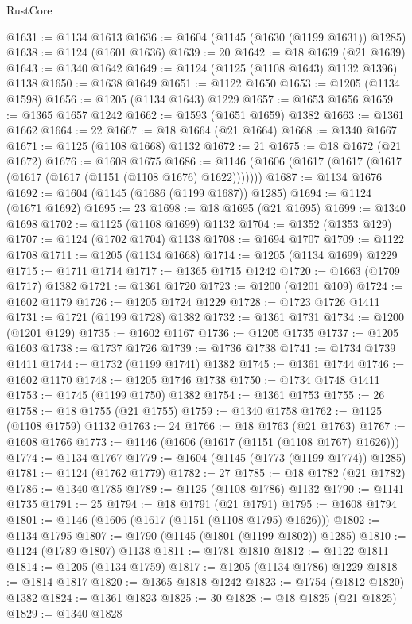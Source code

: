 \begin{lexlean}{RustCore}
\begin{coremodule}
@1631 := @1134 @1613
@1636 := @1604 (@1145 (@1630 (@1199 @1631)) @1285)
@1638 := @1124 (@1601 @1636)
@1639 := 20
@1642 := @18 @1639 (@21 @1639)
@1643 := @1340 @1642
@1649 := @1124 (@1125 (@1108 @1643) @1132 @1396) @1138
@1650 := @1638 @1649
@1651 := @1122 @1650
@1653 := @1205 (@1134 @1598)
@1656 := @1205 (@1134 @1643) @1229
@1657 := @1653 @1656
@1659 := @1365 @1657 @1242
@1662 := @1593 (@1651 @1659) @1382
@1663 := @1361 @1662
@1664 := 22
@1667 := @18 @1664 (@21 @1664)
@1668 := @1340 @1667
@1671 := @1125 (@1108 @1668) @1132
@1672 := 21
@1675 := @18 @1672 (@21 @1672)
@1676 := @1608 @1675
@1686 := @1146 (@1606 (@1617 (@1617 (@1617 (@1617 (@1617 (@1151 (@1108 @1676) @1622)))))))
@1687 := @1134 @1676
@1692 := @1604 (@1145 (@1686 (@1199 @1687)) @1285)
@1694 := @1124 (@1671 @1692)
@1695 := 23
@1698 := @18 @1695 (@21 @1695)
@1699 := @1340 @1698
@1702 := @1125 (@1108 @1699) @1132
@1704 := @1352 (@1353 @129)
@1707 := @1124 (@1702 @1704) @1138
@1708 := @1694 @1707
@1709 := @1122 @1708
@1711 := @1205 (@1134 @1668)
@1714 := @1205 (@1134 @1699) @1229
@1715 := @1711 @1714
@1717 := @1365 @1715 @1242
@1720 := @1663 (@1709 @1717) @1382
@1721 := @1361 @1720
@1723 := @1200 (@1201 @109)
@1724 := @1602 @1179
@1726 := @1205 @1724 @1229
@1728 := @1723 @1726 @1411
@1731 := @1721 (@1199 @1728) @1382
@1732 := @1361 @1731
@1734 := @1200 (@1201 @129)
@1735 := @1602 @1167
@1736 := @1205 @1735
@1737 := @1205 @1603
@1738 := @1737 @1726
@1739 := @1736 @1738
@1741 := @1734 @1739 @1411
@1744 := @1732 (@1199 @1741) @1382
@1745 := @1361 @1744
@1746 := @1602 @1170
@1748 := @1205 @1746 @1738
@1750 := @1734 @1748 @1411
@1753 := @1745 (@1199 @1750) @1382
@1754 := @1361 @1753
@1755 := 26
@1758 := @18 @1755 (@21 @1755)
@1759 := @1340 @1758
@1762 := @1125 (@1108 @1759) @1132
@1763 := 24
@1766 := @18 @1763 (@21 @1763)
@1767 := @1608 @1766
@1773 := @1146 (@1606 (@1617 (@1151 (@1108 @1767) @1626)))
@1774 := @1134 @1767
@1779 := @1604 (@1145 (@1773 (@1199 @1774)) @1285)
@1781 := @1124 (@1762 @1779)
@1782 := 27
@1785 := @18 @1782 (@21 @1782)
@1786 := @1340 @1785
@1789 := @1125 (@1108 @1786) @1132
@1790 := @1141 @1735
@1791 := 25
@1794 := @18 @1791 (@21 @1791)
@1795 := @1608 @1794
@1801 := @1146 (@1606 (@1617 (@1151 (@1108 @1795) @1626)))
@1802 := @1134 @1795
@1807 := @1790 (@1145 (@1801 (@1199 @1802)) @1285)
@1810 := @1124 (@1789 @1807) @1138
@1811 := @1781 @1810
@1812 := @1122 @1811
@1814 := @1205 (@1134 @1759)
@1817 := @1205 (@1134 @1786) @1229
@1818 := @1814 @1817
@1820 := @1365 @1818 @1242
@1823 := @1754 (@1812 @1820) @1382
@1824 := @1361 @1823
@1825 := 30
@1828 := @18 @1825 (@21 @1825)
@1829 := @1340 @1828

\end{coremodule}
\end{lexlean}
